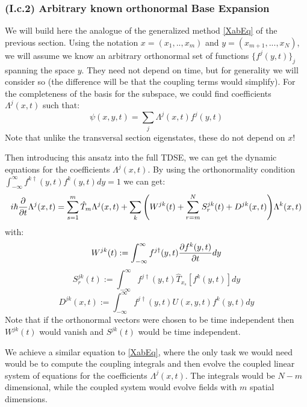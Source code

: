 \documentclass[11pt, a4paper]{article} %
\begin{document}
\subsubsection*{(I.c.2) Arbitrary known orthonormal Base Expansion}

We will build here the analogue of the generalized method \eqref{XabEq} of the previous section. Using the notation $x=(x_1,..,x_m)$ and $y=(x_{m+1},...,x_N)$, we will assume we know an arbitrary orthonormal set of functions $\{ f^j(y,t) \}_j$ spanning the space $y$. They need not depend on time, but for generality we will consider so (the difference will be that the coupling terms would simplify). For the completeness of the basis for the subspace, we could find coefficients $\Lambda^j(x,t)$ such that:
\begin{equation}
\psi(x,y,t)=\sum_j \Lambda^j(x,t) f^j(y,t)
\end{equation}
Note that unlike the transversal section eigenstates, these do not depend on $x$!

Then introducing this ansatz into the full TDSE, we can get the dynamic equations for the coefficients $\Lambda^j(x,t)$. By using the orthonormality condition $\int_{-\infty}^{\infty}f^{k\dagger}(y,t)f^k(y,t)dy=1$ we can get:
\begin{equation}
i\hbar \pdv{}{t}\Lambda^j(x,t)= \sum_{s=1}^m \hat{T}_m \Lambda^j(x,t) + \sum_k \qty( W^{jk}(t)+\sum_{r=m}^NS^{jk}_r(t)+D^{jk}(x,t) )\Lambda^k(x,t)
\end{equation}
with:
\begin{equation}
W^{jk}(t):=\int_{-\infty}^{\infty}f^{j\dagger}(y,t) \pdv{f^k(y,t)}{t} dy
\end{equation}
\begin{equation}
S^{jk}_r(t):=\int_{-\infty}^{\infty}f^{j\dagger}(y,t) \hat{T}_{x_s}[f^k(y,t)] dy
\end{equation}
\begin{equation}
D^{jk}(x,t):=\int_{-\infty}^{\infty}f^{j\dagger}(y,t)U(x,y,t) f^k(y,t) dy
\end{equation}
Note that if the orthonormal vectors were chosen to be time independent then $W^{jk}(t)$ would vanish and $S^{jk}(t)$ would be time independent. 

We achieve a similar equation to \eqref{XabEq}, where the only task we would need would be to compute the coupling integrals and then evolve the coupled linear system of equations for the coefficients $\Lambda^j(x,t)$. The integrals would be $N-m$ dimensional, while the coupled system would evolve fields with $m$ spatial dimensions. 
\end{document}
